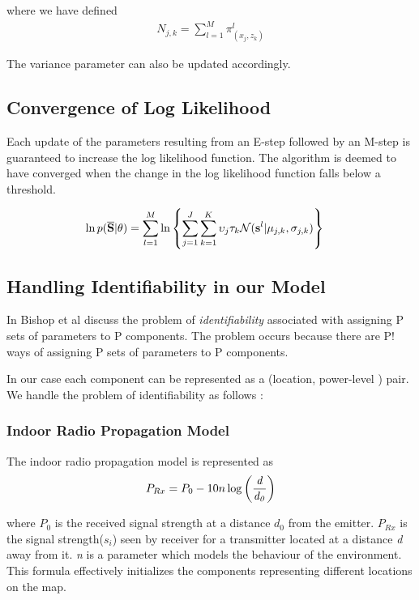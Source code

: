 \documentclass{Localization-PaperWriteupDraft}
\begin{document}
where we have defined 
\begin{align}
{N_{j,k}} = \sum_{l=1}^{M} \pi_{({x_{j}}, {z_{k}})}^{l}
\end{align}


The variance parameter can also be updated accordingly.

\subsection{Convergence of Log Likelihood}
\label{subsec:convergenceofloglikelihood}

Each update of the parameters resulting from an E-step followed by an
M-step is guaranteed to increase the log likelihood function. The algorithm is deemed to have converged when the change in the log likelihood function falls below a threshold.

\begin{align}
\ln p({\bf \overline{S}} | {\bf \theta}) &= \sum_{l=1}^{M} \ln \left\{
\sum_{j=1}^J \sum_{k=1}^K \upsilon_{j} \tau_{k} \mathcal N ({{\bf {s}}^{l}} | {{\bf {\mu}}_{j,k}}, {{\bf \sigma}_{j,k}})\right\} 
\end{align}

\subsection{Handling Identifiability in our Model}
\label{subsec:handlingidentifiabilityinourmodel}

In \cite{Bishop:2006:PRM:1162264} Bishop et al discuss the problem of {\it
identifiability} associated with assigning P sets of parameters to P
components. The problem occurs because there are P! ways of assigning P
sets of parameters to P components. 

In our case each component can be represented as a (location,
power-level ) pair. We handle the problem of identifiability as follows :

\subsubsection{Indoor Radio Propagation Model}
\label{subsubsec:indoorradiopropagationmodel}

The indoor radio propagation model is represented as
\begin{align}
P_{Rx} = P_{0} - 10n\log\left(\frac {\it d} {\it d_{0}}\right) 
\end{align}

\noindent
where $P_{0}$ is the received signal strength at a distance $d_{0}$ from the
emitter. $P_{Rx}$ is the signal strength($s_{i}$) seen by receiver for a
transmitter located at a distance {\it d} away from it. {\it n} is a
parameter which models the behaviour of the environment. This formula
effectively initializes the components representing different locations
on the map.
\end{document}
